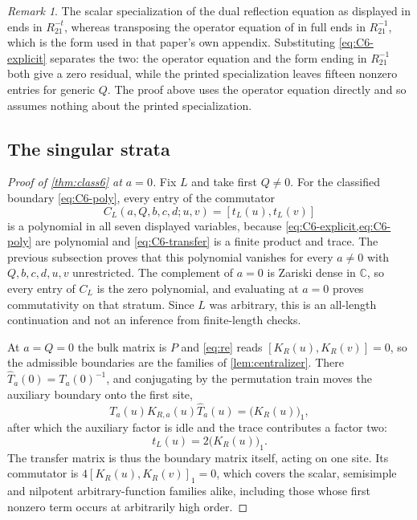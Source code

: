 \documentclass[11pt,reqno]{amsart}
\theoremstyle{plain}
\theoremstyle{definition}
\theoremstyle{remark}
\newtheorem{remark}[theorem]{Remark}
\numberwithin{equation}{section}
\newcommand{\C}{\mathbb C}
\begin{document}
\begin{remark}
\label{rem:dual-display}
The scalar specialization of the dual reflection equation as displayed in
\cite[Eq.~(2.13)]{Vlaar_2015bt} ends in $R_{21}^{-t}$, whereas transposing the
operator equation of \cite[Thm.~2.4]{Vlaar_2015bt} in full ends in
$R_{21}^{-1}$, which is the form used in that paper's own appendix. Substituting
\cref{eq:C6-explicit} separates the two: the operator equation and the form
ending in $R_{21}^{-1}$ both give a zero residual, while the printed
specialization leaves fifteen nonzero entries for generic $Q$. The proof above
uses the operator equation directly and so assumes nothing about the printed
specialization.
\end{remark}

\subsection{The singular strata}

\begin{proof}[Proof of \cref{thm:class6} at $a=0$]
Fix $L$ and take first $Q\ne0$. For the classified boundary \cref{eq:C6-poly},
every entry of the commutator
\begin{equation}
C_L(a,Q,b,c,d;u,v)=[t_L(u),t_L(v)]
\label{eq:C6-commutator-poly}
\end{equation}
is a polynomial in all seven displayed variables, because
\cref{eq:C6-explicit,eq:C6-poly} are polynomial and \cref{eq:C6-transfer} is a
finite product and trace. The previous subsection proves that this polynomial
vanishes for every $a\ne0$ with $Q,b,c,d,u,v$ unrestricted. The complement of
$a=0$ is Zariski dense in $\C$, so every entry of $C_L$ is the zero polynomial,
and evaluating at $a=0$ proves commutativity on that stratum. Since $L$ was
arbitrary, this is an all-length continuation and not an inference from
finite-length checks.

At $a=Q=0$ the bulk matrix is $P$ and \cref{eq:re} reads $[K_R(u),K_R(v)]=0$, so
the admissible boundaries are the families of \cref{lem:centralizer}. There
$\widehat T_a(0)=T_a(0)^{-1}$, and conjugating by the permutation train moves the
auxiliary boundary onto the first site,
\begin{equation}
T_a(u)K_{R,a}(u)\widehat T_a(u)=\bigl(K_R(u)\bigr)_1,
\label{eq:C6-P-reduction}
\end{equation}
after which the auxiliary factor is idle and the trace contributes a factor two:
\begin{equation}
t_L(u)=2\bigl(K_R(u)\bigr)_1.
\label{eq:C6-P-transfer}
\end{equation}
The transfer matrix is thus the boundary matrix itself, acting on one site. Its
commutator is $4[K_R(u),K_R(v)]_1=0$, which covers the scalar, semisimple and
nilpotent arbitrary-function families alike, including those whose first nonzero
term occurs at arbitrarily high order.
\end{proof}
\end{document}
